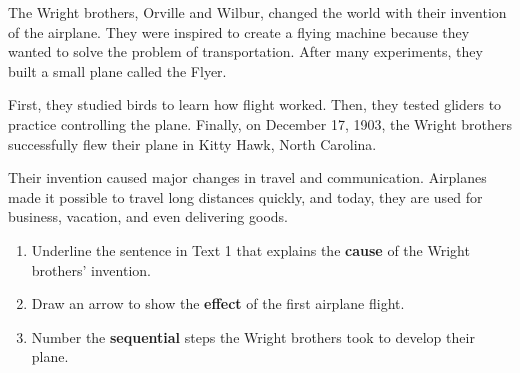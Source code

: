 \documentclass[12pt]{article}
\begin{document}
\begin{tcolorbox}[colframe=black!60, colback=white, 
coltitle=black, colbacktitle=black!15, fonttitle=\bfseries\Large, 
title=Text: The Wright Brothers and the First Flight, halign title=center, left=10pt, right=10pt, top=10pt, bottom=15pt]
The Wright brothers, Orville and Wilbur, changed the world with their invention of the airplane. They were inspired to create a flying machine because they wanted to solve the problem of transportation. After many experiments, they built a small plane called the Flyer.

First, they studied birds to learn how flight worked. Then, they tested gliders to practice controlling the plane. Finally, on December 17, 1903, the Wright brothers successfully flew their plane in Kitty Hawk, North Carolina. 

Their invention caused major changes in travel and communication. Airplanes made it possible to travel long distances quickly, and today, they are used for business, vacation, and even delivering goods.
\end{tcolorbox}

\vspace{1em}

\begin{tcolorbox}[colframe=black!60, colback=white, 
coltitle=black, colbacktitle=black!15, fonttitle=\bfseries\Large, 
title=Guided Practice, halign title=center, left=10pt, right=10pt, top=10pt, bottom=15pt]
\begin{enumerate}[itemsep=3em]
    \item Underline the sentence in Text 1 that explains the \textbf{cause} of the Wright brothers’ invention. 
    \item Draw an arrow to show the \textbf{effect} of the first airplane flight.
    \item Number the \textbf{sequential} steps the Wright brothers took to develop their plane.
\vspace{1em}

\end{enumerate}
\end{tcolorbox}

\vspace{1em}
\end{document}
